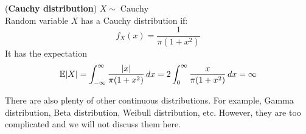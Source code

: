\documentclass{huhtakm-template-book}
\newcommand{\expect}{\mathbb{E}}
\DeclareMathOperator{\Cauchy}{Cauchy}
\begin{document}
    \begin{eg}(\textbf{Cauchy distribution}) $X\sim\Cauchy$\\
        Random variable $X$ has a Cauchy distribution if:
        \begin{equation*}
            f_{X}(x)=\frac{1}{\pi(1+x^{2})}
        \end{equation*}
        It has the expectation
        \begin{equation*}
            \expect|X|=\intinfty\frac{|x|}{\pi(1+x^{2})}\,dx=2\intlu{0}{\infty}\frac{x}{\pi(1+x^{2})}\,dx=\infty
        \end{equation*}
    \end{eg}
    There are also plenty of other continuous distributions. For example, Gamma distribution, Beta distribution, Weibull distribution, etc. However, they are too complicated and we will not discuss them here.
\end{document}
